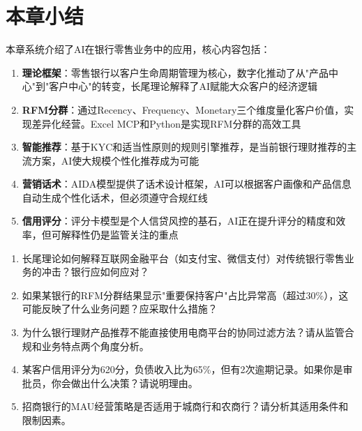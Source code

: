 
\section*{本章小结}

本章系统介绍了AI在银行零售业务中的应用，核心内容包括：

\begin{enumerate}[leftmargin=2em]
  \item \textbf{理论框架}：零售银行以客户生命周期管理为核心，数字化推动了从"产品中心"到"客户中心"的转变，长尾理论解释了AI赋能大众客户的经济逻辑
  \item \textbf{RFM分群}：通过Recency、Frequency、Monetary三个维度量化客户价值，实现差异化经营。Excel MCP和Python是实现RFM分群的高效工具
  \item \textbf{智能推荐}：基于KYC和适当性原则的规则引擎推荐，是当前银行理财推荐的主流方案，AI使大规模个性化推荐成为可能
  \item \textbf{营销话术}：AIDA模型提供了话术设计框架，AI可以根据客户画像和产品信息自动生成个性化话术，但必须遵守合规红线
  \item \textbf{信用评分}：评分卡模型是个人信贷风控的基石，AI正在提升评分的精度和效率，但可解释性仍是监管关注的重点
\end{enumerate}


\begin{exercisebox}[思考题]
\begin{enumerate}
  \item 长尾理论如何解释互联网金融平台（如支付宝、微信支付）对传统银行零售业务的冲击？银行应如何应对？
  \item 如果某银行的RFM分群结果显示"重要保持客户"占比异常高（超过30\%），这可能反映了什么业务问题？应采取什么措施？
  \item 为什么银行理财产品推荐不能直接使用电商平台的协同过滤方法？请从监管合规和业务特点两个角度分析。
  \item 某客户信用评分为620分，负债收入比为65\%，但有2次逾期记录。如果你是审批员，你会做出什么决策？请说明理由。
  \item 招商银行的MAU经营策略是否适用于城商行和农商行？请分析其适用条件和限制因素。
\end{enumerate}
\end{exercisebox}
